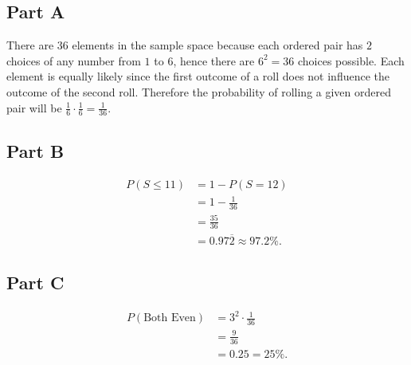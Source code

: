 \documentclass[12pt]{extarticle}
\begin{document}
\subsection*{Part A}
There are 36 elements in the sample space because each ordered pair has $2$ choices of any number from $1$ to $6$, hence there are $6^2 = 36$ choices possible. Each element is equally likely since the first outcome of a roll does not influence the outcome of the second roll. Therefore the probability of rolling a given ordered pair will be $\frac{1}{6} \cdot \frac{1}{6} = \frac{1}{36}$.

\subsection*{Part B}

\begin{align*}
	P(S \leq 11) &= 1 - P(S = 12) \\
							 &= 1 - \frac{1}{36} \\
							 &= \frac{35}{36} \\
							 &= 0.97\overline{2} \approx 97.2\%
.\end{align*}

\subsection*{Part C}
\begin{align*}
	P(\text{Both Even}) &= 3^2 \cdot \frac{1}{36} \\
											&= \frac{9}{36} \\
											&= 0.25 = 25\%
.\end{align*}
\end{document}
